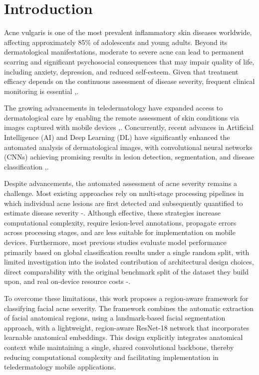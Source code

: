 \documentclass[conference]{IEEEtran}
\begin{document}
\section{Introduction}
Acne vulgaris is one of the most prevalent inflammatory skin diseases worldwide, affecting approximately 85\% of adolescents and young adults. Beyond its dermatological manifestations, moderate to severe acne can lead to permanent scarring and significant psychosocial consequences that may impair quality of life, including anxiety, depression, and reduced self-esteem. Given that treatment efficacy depends on the continuous assessment of disease severity, frequent clinical monitoring is essential \cite{b1},\cite{b2}.

The growing advancements in teledermatology have expanded access to dermatological care by enabling the remote assessment of skin conditions via images captured with mobile devices \cite{b3},\cite{b4}. Concurrently, recent advances in Artificial Intelligence (AI) and Deep Learning (DL) have significantly enhanced the automated analysis of dermatological images, with convolutional neural networks (CNNs) achieving promising results in lesion detection, segmentation, and disease classification \cite{b5},\cite{b6}.

Despite advancements, the automated assessment of acne severity remains a challenge. Most existing approaches rely on multi-stage processing pipelines in which individual acne lesions are first detected and subsequently quantified to estimate disease severity \cite{b7} -\cite{b9}. Although effective, these strategies increase computational complexity, require lesion-level annotations, propagate errors across processing stages, and are less suitable for implementation on mobile devices. Furthermore, most previous studies evaluate model performance primarily based on global classification results under a single random split, with limited investigation into the isolated contribution of architectural design choices, direct comparability with the original benchmark split of the dataset they build upon, and real on-device resource costs \cite{b10} -\cite{b12}.

To overcome these limitations, this work proposes a region-aware framework for classifying facial acne severity. The framework combines the automatic extraction of facial anatomical regions, using a landmark-based facial segmentation approach, with a lightweight, region-aware ResNet-18 network that incorporates learnable anatomical embeddings. This design explicitly integrates anatomical context while maintaining a single, shared convolutional backbone, thereby reducing computational complexity and facilitating implementation in teledermatology mobile applications.
\end{document}

